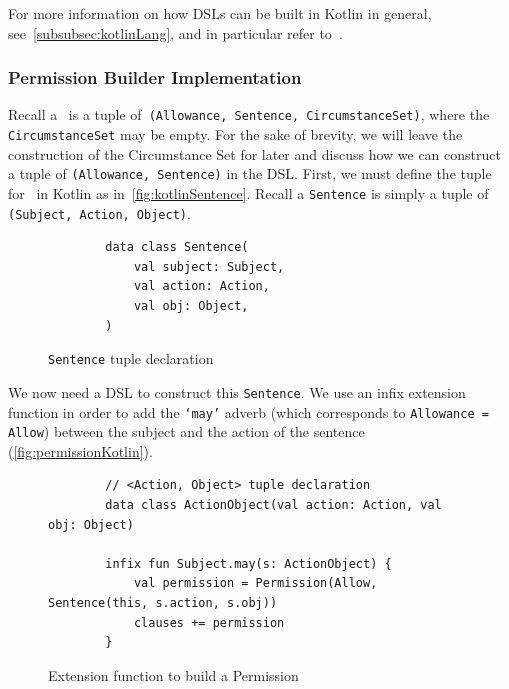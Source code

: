For more information on how DSLs can be built in Kotlin in general, see~\autoref{subsubsec:kotlinLang}, and in particular refer to~\cite{kotlinTypeSafeBuilders}.

\subsubsection{Permission Builder Implementation}

Recall a~ is a tuple of~\texttt{(Allowance, Sentence, CircumstanceSet)}, where the \texttt{CircumstanceSet} may be empty.
For the sake of brevity, we will leave the construction of the Circumstance Set for later and discuss how we can construct a tuple of \texttt{(Allowance, Sentence)} in the DSL.
First, we must define the tuple for~ in Kotlin as in~\autoref{fig:kotlinSentence}.
Recall a \texttt{Sentence} is simply a tuple of \texttt{(Subject, Action, Object)}.

\begin{figure}[h]
    \centering
    \begin{minipage}{0.4\textwidth}
        \begin{verbatim}
        data class Sentence(
            val subject: Subject,
            val action: Action,
            val obj: Object,
        )
        \end{verbatim}
    \end{minipage}
    \caption{\texttt{Sentence} tuple declaration}\label{fig:kotlinSentence}
\end{figure}

We now need a DSL to construct this \texttt{Sentence}.
We use an infix extension function in order to add the \texttt{`may'} adverb (which corresponds to \texttt{Allowance = Allow}) between the subject and the action of the sentence (\autoref{fig:permissionKotlin}).



\begin{figure}[h]
    \centering
    \begin{minipage}{\textwidth}
        \begin{verbatim}
        // <Action, Object> tuple declaration
        data class ActionObject(val action: Action, val obj: Object)

        infix fun Subject.may(s: ActionObject) {
            val permission = Permission(Allow, Sentence(this, s.action, s.obj))
            clauses += permission
        }
        \end{verbatim}
    \end{minipage}
    \caption{Extension function to build a Permission}\label{fig:permissionKotlin}
\end{figure}



